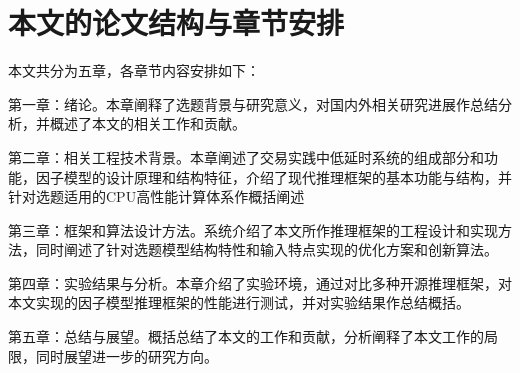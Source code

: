 \section{本文的论文结构与章节安排}

\label{sec:arrangement}

本文共分为五章，各章节内容安排如下：

第一章：绪论。本章阐释了选题背景与研究意义，对国内外相关研究进展作总结分析，并概述了本文的相关工作和贡献。

第二章：相关工程技术背景。本章阐述了交易实践中低延时系统的组成部分和功能，因子模型的设计原理和结构特征，介绍了现代推理框架的基本功能与结构，并针对选题适用的CPU高性能计算体系作概括阐述

第三章：框架和算法设计方法。系统介绍了本文所作推理框架的工程设计和实现方法，同时阐述了针对选题模型结构特性和输入特点实现的优化方案和创新算法。  

第四章：实验结果与分析。本章介绍了实验环境，通过对比多种开源推理框架，对本文实现的因子模型推理框架的性能进行测试，并对实验结果作总结概括。

第五章：总结与展望。概括总结了本文的工作和贡献，分析阐释了本文工作的局限，同时展望进一步的研究方向。
